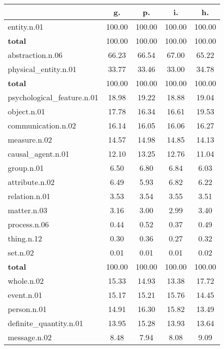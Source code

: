 \begin{table}[h!]
\begin{center}
\begin{tabular}{| l || c | c | c | c |}\hline
 & {\bf g.} & {\bf p.} & {\bf i.} & {\bf h.} \\\hline\hline
entity.n.01 & 100.00  & 100.00  & 100.00  & 100.00 \\\hline\hline
{{\bf total}} & 100.00  & 100.00  & 100.00  & 100.00 \\\hline\hline\hline
abstraction.n.06 & 66.23  & 66.54  & 67.00  & 65.22 \\\hline
physical\_entity.n.01 & 33.77  & 33.46  & 33.00  & 34.78 \\\hline\hline
{{\bf total}} & 100.00  & 100.00  & 100.00  & 100.00 \\\hline\hline\hline
psychological\_feature.n.01 & 18.98  & 19.22  & 18.88  & 19.04 \\\hline
object.n.01 & 17.78  & 16.34  & 16.61  & 19.53 \\\hline
communication.n.02 & 16.14  & 16.05  & 16.06  & 16.27 \\\hline
measure.n.02 & 14.57  & 14.98  & 14.85  & 14.13 \\\hline
causal\_agent.n.01 & 12.10  & 13.25  & 12.76  & 11.04 \\\hline
group.n.01 & 6.50  & 6.80  & 6.84  & 6.03 \\\hline
attribute.n.02 & 6.49  & 5.93  & 6.82  & 6.22 \\\hline
relation.n.01 & 3.53  & 3.54  & 3.55  & 3.51 \\\hline
matter.n.03 & 3.16  & 3.00  & 2.99  & 3.40 \\\hline
process.n.06 & 0.44  & 0.52  & 0.37  & 0.49 \\\hline
thing.n.12 & 0.30  & 0.36  & 0.27  & 0.32 \\\hline
set.n.02 & 0.01  & 0.01  & 0.01  & 0.02 \\\hline\hline
{{\bf total}} & 100.00  & 100.00  & 100.00  & 100.00 \\\hline\hline\hline
whole.n.02 & 15.33  & 14.93  & 13.38  & 17.72 \\\hline
event.n.01 & 15.17  & 15.21  & 15.76  & 14.45 \\\hline
person.n.01 & 14.91  & 16.30  & 15.82  & 13.49 \\\hline
definite\_quantity.n.01 & 13.95  & 15.28  & 13.93  & 13.64 \\\hline
message.n.02 & 8.48  & 7.94  & 8.08  & 9.09 \\\hline

\end{tabular}
\end{center}
\end{table}
